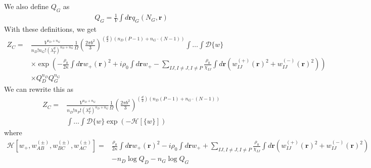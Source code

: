 \documentclass{article}
\begin{document}
  We also define $Q_G$ as
  \begin{align}
    Q_G = \frac{1}{V}  \int d \mathbf{r}{q_G} (N_G, \mathbf{r})
  \end{align}
With these definitions, we get
\begin{align*}
  Z_C =& \frac{V^{n_D+n_G}}
              {n_D!n_G! \left( \lambda_T^d \right)^{n_D+n_G}}
    \frac{1}{\Omega}
    \left( \frac{2\pi b^2}{3} \right)
    ^ {(\frac{d}{2}) (n_D (P-1) + n_G \cdot (N-1) )  }
    \int \hdots \int \mathcal{D} \{w\} \\
    &\times \exp \left(
      - \frac{\rho_0}{2\kappa} \int d \mathbf{r} w_+(\mathbf{r})^2
      + i \rho_0 \int d\mathbf{r} w_+
      - \sum_{IJ,I \ne J, I \ne P}
      \frac{\rho_0}{\chi_{IJ}}
      \int d \mathbf{r}
      \left(
        w_{IJ}^{(+)} (\mathbf{r})^2 + w_{IJ}^{(-)} (\mathbf{r})^2
      \right)
    \right) \\
    &\times Q_D^{n_D} Q_G^{n_G}
\end{align*}
We can rewrite this as
\begin{align*}
  Z_C =& \frac{V^{n_D+n_G}}
              {n_D!n_P! \left( \lambda_T^d \right)^{n_D+n_G}}
    \frac{1}{\Omega}
    \left( \frac{2\pi b^2}{3} \right)
    ^ {(\frac{d}{2}) (n_D (P-1) + n_G \cdot (N-1) )  }
    \\
    &\int \hdots \int \mathcal{D} \{w\}
    \exp \left(
      -\mathcal{H}[\{w\}]
    \right)
\end{align*}
where
\begin{align*}
  \mathcal{H}[w_+, w_{AB}^{(\pm)},w_{BC}^{(\pm)},w_{AC}^{(\pm)}] =&
    \frac{\rho_0}{2\kappa} \int d \mathbf{r} w_+(\mathbf{r})^2
    - i \rho_0 \int d\mathbf{r} w_+
    + \sum_{IJ,I \ne J, I \ne P}
    \frac{\rho_0}{\chi_{IJ}}
    \int d \mathbf{r}
    \left(
      w_{IJ}^{(+)} (\mathbf{r})^2 + w_{IJ}^{(-)} (\mathbf{r})^2
    \right) \\
    &- n_D \log Q_D - n_G \log Q_G
\end{align*}



\end{document}
